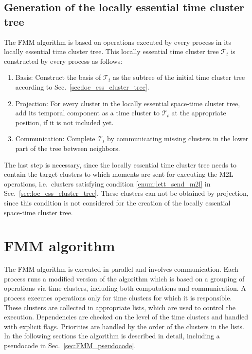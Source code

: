 \documentclass[a4paper,11pt]{article}
\theoremstyle{plain}
\theoremstyle{definition}
\theoremstyle{remark}
\begin{document}
\subsection{Generation of the locally essential time cluster tree}
The FMM algorithm is based on operations executed by every process in its locally essential time cluster tree. This locally essential time cluster tree $\mathcal{T}_t$ is constructed by every process as follows:
\begin{enumerate}
  \item Basis: Construct the basis of $\mathcal{T}_t$ as the subtree of the initial time cluster tree according to Sec.~\ref{sec:loc_ess_cluster_tree}.
  \item Projection: For every cluster in the locally essential space-time cluster tree, add its temporal component as a time cluster to $\mathcal{T}_t$ at the appropriate position, if it is not included yet.
  \item Communication: Complete $\mathcal{T}_t$ by communicating missing clusters in the lower part of the tree between neighbors. 
\end{enumerate}
The last step is necessary, since the locally essential time cluster tree needs to contain the target clusters to which moments are sent for executing the M2L operations, i.e.~clusters satisfying condition \ref{enum:lett_send_m2l} in Sec.~\ref{sec:loc_ess_cluster_tree}. These clusters can not be obtained by projection, since this condition is not considered for the creation of the locally essential space-time cluster tree.

\section{FMM algorithm} \label{sec:fmm}
The FMM algorithm is executed in parallel and involves communication. Each process runs a modified version of the 
algorithm which is based on a grouping of operations via time clusters, including both computations and communication. A process executes operations only for time clusters for which it is responsible. These clusters are collected in appropriate lists, which are used to control the execution. Dependencies are checked on the level of the time clusters and handled with explicit flags. Priorities are handled by the order of the clusters in the lists. In the following sections the algorithm is described in detail, including a pseudocode in Sec.~\ref{sec:FMM_pseudocode}.
\end{document}
